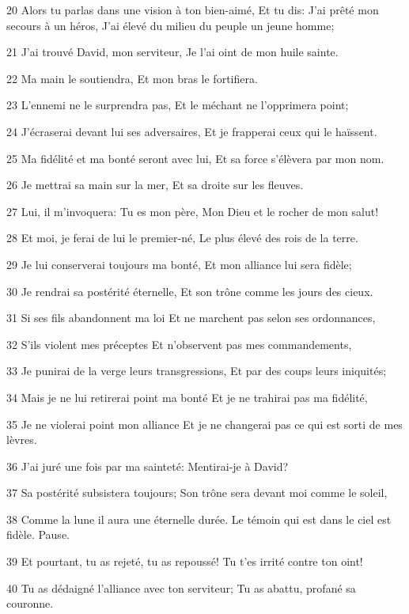\par 20 Alors tu parlas dans une vision à ton bien-aimé, Et tu dis: J'ai prêté mon secours à un héros, J'ai élevé du milieu du peuple un jeune homme;
\par 21 J'ai trouvé David, mon serviteur, Je l'ai oint de mon huile sainte.
\par 22 Ma main le soutiendra, Et mon bras le fortifiera.
\par 23 L'ennemi ne le surprendra pas, Et le méchant ne l'opprimera point;
\par 24 J'écraserai devant lui ses adversaires, Et je frapperai ceux qui le haïssent.
\par 25 Ma fidélité et ma bonté seront avec lui, Et sa force s'élèvera par mon nom.
\par 26 Je mettrai sa main sur la mer, Et sa droite sur les fleuves.
\par 27 Lui, il m'invoquera: Tu es mon père, Mon Dieu et le rocher de mon salut!
\par 28 Et moi, je ferai de lui le premier-né, Le plus élevé des rois de la terre.
\par 29 Je lui conserverai toujours ma bonté, Et mon alliance lui sera fidèle;
\par 30 Je rendrai sa postérité éternelle, Et son trône comme les jours des cieux.
\par 31 Si ses fils abandonnent ma loi Et ne marchent pas selon ses ordonnances,
\par 32 S'ils violent mes préceptes Et n'observent pas mes commandements,
\par 33 Je punirai de la verge leurs transgressions, Et par des coups leurs iniquités;
\par 34 Mais je ne lui retirerai point ma bonté Et je ne trahirai pas ma fidélité,
\par 35 Je ne violerai point mon alliance Et je ne changerai pas ce qui est sorti de mes lèvres.
\par 36 J'ai juré une fois par ma sainteté: Mentirai-je à David?
\par 37 Sa postérité subsistera toujours; Son trône sera devant moi comme le soleil,
\par 38 Comme la lune il aura une éternelle durée. Le témoin qui est dans le ciel est fidèle. Pause.
\par 39 Et pourtant, tu as rejeté, tu as repoussé! Tu t'es irrité contre ton oint!
\par 40 Tu as dédaigné l'alliance avec ton serviteur; Tu as abattu, profané sa couronne.
